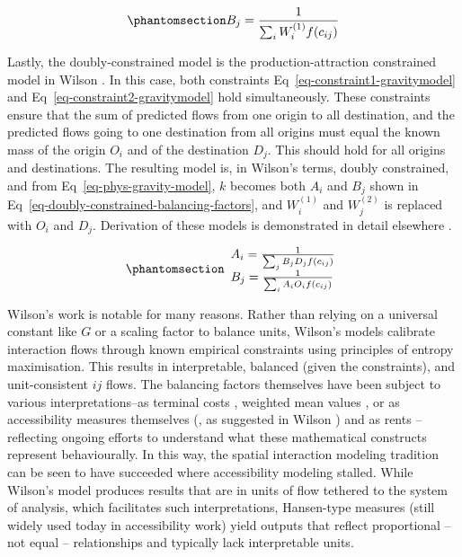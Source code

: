 \documentclass[
  10pt,
  letterpaper,
]{article}
\begin{document}
\begin{equation}\phantomsection\label{eq-attraction-constrained-balancing-factor}{
B_j = \frac{1}{\sum_i W_i^{(1)} f(c_{ij})}
}\end{equation}

Lastly, the doubly-constrained model is the production-attraction
constrained model in Wilson \citep{wilson1971}. In this case, both
constraints Eq~\ref{eq-constraint1-gravitymodel} and
Eq~\ref{eq-constraint2-gravitymodel} hold simultaneously. These
constraints ensure that the sum of predicted flows from one origin to
all destination, and the predicted flows going to one destination from
all origins must equal the known mass of the origin \(O_i\) and of the
destination \(D_j\). This should hold for all origins and destinations.
The resulting model is, in Wilson's terms, doubly constrained, and from
Eq~\ref{eq-phys-gravity-model}, \(k\) becomes both \(A_i\) and \(B_j\)
shown in Eq~\ref{eq-doubly-constrained-balancing-factors}, and
\(W_i^{(1)}\) and \(W_j^{(2)}\) is replaced with \(O_i\) and \(D_j\).
Derivation of these models is demonstrated in detail elsewhere
\citep[e.g.,][]{ortuzar_2011_modelling, wilsonSTATISTICALTHEORYSPATIAL1967}.

\begin{equation}\phantomsection\label{eq-doubly-constrained-balancing-factors}{
\begin{array}{l}
A_i = \frac{1}{\sum_j B_j D_j f(c_{ij})}\\
B_j = \frac{1}{\sum_i A_i O_i f(c_{ij})}
\end{array}
}\end{equation}

Wilson's work is notable for many reasons. Rather than relying on a
universal constant like \(G\) or a scaling factor to balance units,
Wilson's models calibrate interaction flows through known empirical
constraints using principles of entropy maximisation. This results in
interpretable, balanced (given the constraints), and unit-consistent
\(ij\) flows. The balancing factors themselves have been subject to
various interpretations--as terminal costs
\citep{dieter1962distribution}, weighted mean values
\citep{kirbyNormalizingFactorsGravity1970}, or as accessibility measures
themselves (\citep{cesario1977new}, as suggested in Wilson
\citep{wilson1971}) and as rents
\citep{morphetGravityModelCalibration2023}--reflecting ongoing efforts
to understand what these mathematical constructs represent
behaviourally. In this way, the spatial interaction modeling tradition
can be seen to have succeeded where accessibility modeling stalled.
While Wilson's model produces results that are in units of flow tethered
to the system of analysis, which facilitates such interpretations,
Hansen-type measures (still widely used today in accessibility work)
yield outputs that reflect proportional -- not equal -- relationships
and typically lack interpretable units.
\end{document}
